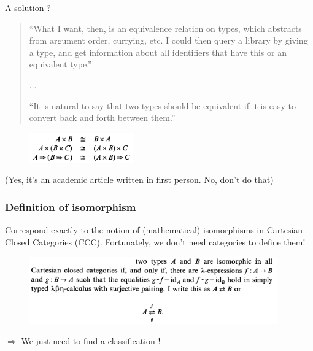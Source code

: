 \documentclass[aspectratio=169,dvipsnames,svgnames,10pt]{beamer}
\begin{document}
\begin{frame}{A solution ?}
  \begin{quote}
    ``What I want, then, is an equivalence relation on types, which abstracts from
    argument order, currying, etc. I could then query a library by giving a type, and get information about all identifiers that have this or an equivalent type.''

    ...

    ``It is natural to say that two types should
be equivalent if it is easy to convert back and forth between them.''
  \end{quote}

  \begin{figure}
    \centering
    \includegraphics[width=0.4\textwidth]{examples}
  \end{figure}  

  {\small
  (Yes, it's an academic article written in first person. No, don't do that)}
\end{frame}

\begin{frame}
  \frametitle{Definition of isomorphism}

  Correspond exactly to the notion of (mathematical) isomorphisms
  in Cartesian Closed Categories (CCC).
  Fortunately, we don't need categories to define them!
  
  \begin{figure}
    \centering
    \includegraphics[width=0.95\textwidth]{definitioniso}
  \end{figure}  
  \pause

  $\Rightarrow$ We just need to find a classification !
  
\end{frame}
\end{document}
